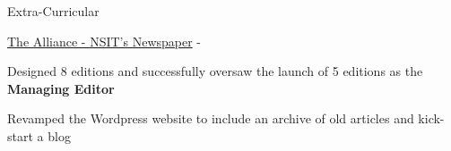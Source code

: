 \documentclass[../resume.tex]{subfiles}
\begin{document}

\begin{rSection}{Extra-Curricular} \itemsep -3pt

    \begin{rSubsection}
        {\href{https://go.rohit.page/alliance}{The Alliance - NSIT's Newspaper}}
        {  - }
        {}{}

        \item Designed 8 editions and successfully oversaw the launch of 5 editions as the \textbf{Managing Editor}
        \item Revamped the Wordpress website to include an archive of old articles and kick-start a blog
    \end{rSubsection}

\end{rSection}

\end{document}

